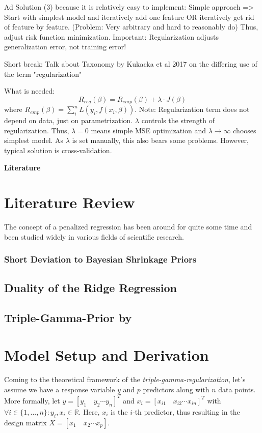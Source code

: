 \documentclass[12pt,a4paper]{article}
\newenvironment{lightbluebox}{%
    \begin{tcolorbox}[colback=lightblue, colframe=lightblue, fontupper=\itshape]%
}{%
    \end{tcolorbox}%
}
\begin{document}
\begin{lightbluebox}
Ad Solution (3) because it is relatively easy to implement: Simple approach => Start with simplest model and iteratively add one feature OR iteratively get rid of feature by feature. (Problem: Very arbitrary and hard to reasonably do) Thus, adjust risk function minimization. Important: Regularization adjusts generalization error, not training error!

Short break: Talk about Taxonomy by Kukacka et al 2017 on the differing use of the term "regularization" 

What is needed: 
\[
R_{reg}(\beta) = R_{emp}(\beta)+ \lambda \cdot J(\beta)
\]
where $R_{emp}(\beta) = \sum_i^n L(y_i, f(x_i, \beta))$. Note: Regularization term does not depend on data, just on parametrization. $\lambda$ controls the strength of regularization. Thus, $\lambda = 0$ means simple MSE optimization and $\lambda \to \infty$ chooses simplest model. As $\lambda$ is set manually, this also bears some problems. However, typical solution is cross-validation. 

\textbf{Literature}
\parencite{Taxonomy2017}
\end{lightbluebox}
\newpage

\section{Literature Review}

The concept of a penalized regression has been around for quite some time and been studied widely in various fields of scientific research. 

\subsubsection{Short Deviation to Bayesian Shrinkage Priors}

\subsection{Duality of the Ridge Regression}

\subsection{Triple-Gamma-Prior by \textcite{TGP2020}}

\newpage
\section{Model Setup and Derivation}
Coming to the theoretical framework of the \textit{triple-gamma-regularization}, let's assume we have a response variable $y$ and $p$ predictors along with $n$ data points. More formally, let $y=[y_1  \quad y_2 \cdots y_n]^T$ and $x_i = [x_{i1} \quad x_{i2} \cdots x_{in}]^T$ with $\forall i\in \{1,...,n\}: y_i, x_i \in \mathbb{R}$. Here, $x_i$ is the $i$-th predictor, thus resulting in the design matrix $X = [x_1 \quad x_2 \cdots x_p]$. \\
\end{document}
